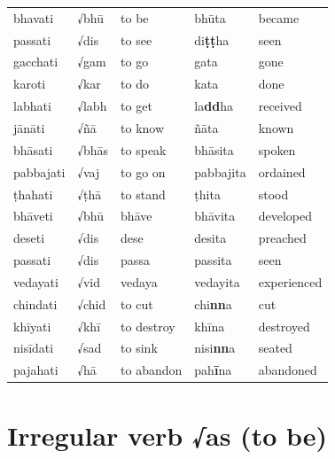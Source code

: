 \documentclass[a4paper]{memoir}
\begin{document}
\begin{center}
\begin{tabular}{lllll}
bhavati & √bhū & to be & bhūta & became\\[0pt]
passati & √dis & to see & di\textbf{ṭṭ}ha & seen\\[0pt]
gacchati & √gam & to go & gata & gone\\[0pt]
karoti & √kar & to do & kata & done\\[0pt]
labhati & √labh & to get & la\textbf{dd}ha & received\\[0pt]
jānāti & √ñā & to know & ñāta & known\\[0pt]
bhāsati & √bhās & to speak & bhāsita & spoken\\[0pt]
pabbajati & √vaj & to go on & pabbajita & ordained\\[0pt]
ṭhahati & √ṭhā & to stand & ṭhita & stood\\[0pt]
bhāveti & √bhū & bhāve & bhāvita & developed\\[0pt]
deseti & √dis & dese & desita & preached\\[0pt]
passati & √dis & passa & passita & seen\\[0pt]
vedayati & √vid & vedaya & vedayita & experienced\\[0pt]
chindati & √chid & to cut & chi\textbf{nn}a & cut\\[0pt]
khīyati & √khī & to destroy & khīna & destroyed\\[0pt]
nisīdati & √sad & to sink & nisi\textbf{nn}a & seated\\[0pt]
pajahati & √hā & to abandon & pah\textbf{ī}na & abandoned\\[0pt]
\end{tabular}
\end{center}

\clearpage

\section{Irregular verb √as (to be)}
\label{sec:orgd680142}
\end{document}
